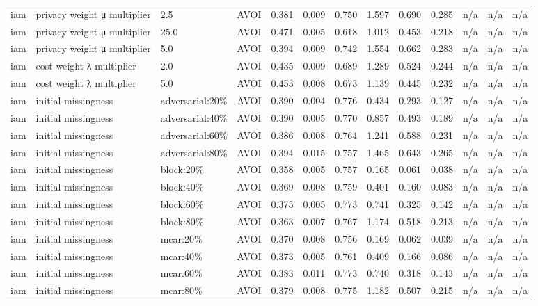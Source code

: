 \begin{table}[!ht]
{\begin{tabular}{lllllllllllll}
iam & privacy weight μ multiplier & 2.5 & AVOI & 0.381 & 0.009 & 0.750 & 1.597 & 0.690 & 0.285 & n/a & n/a & n/a \\
iam & privacy weight μ multiplier & 25.0 & AVOI & 0.471 & 0.005 & 0.618 & 1.012 & 0.453 & 0.218 & n/a & n/a & n/a \\
iam & privacy weight μ multiplier & 5.0 & AVOI & 0.394 & 0.009 & 0.742 & 1.554 & 0.662 & 0.283 & n/a & n/a & n/a \\
iam & cost weight λ multiplier & 2.0 & AVOI & 0.435 & 0.009 & 0.689 & 1.289 & 0.524 & 0.244 & n/a & n/a & n/a \\
iam & cost weight λ multiplier & 5.0 & AVOI & 0.453 & 0.008 & 0.673 & 1.139 & 0.445 & 0.232 & n/a & n/a & n/a \\
iam & initial missingness & adversarial:20\% & AVOI & 0.390 & 0.004 & 0.776 & 0.434 & 0.293 & 0.127 & n/a & n/a & n/a \\
iam & initial missingness & adversarial:40\% & AVOI & 0.390 & 0.005 & 0.770 & 0.857 & 0.493 & 0.189 & n/a & n/a & n/a \\
iam & initial missingness & adversarial:60\% & AVOI & 0.386 & 0.008 & 0.764 & 1.241 & 0.588 & 0.231 & n/a & n/a & n/a \\
iam & initial missingness & adversarial:80\% & AVOI & 0.394 & 0.015 & 0.757 & 1.465 & 0.643 & 0.265 & n/a & n/a & n/a \\
iam & initial missingness & block:20\% & AVOI & 0.358 & 0.005 & 0.757 & 0.165 & 0.061 & 0.038 & n/a & n/a & n/a \\
iam & initial missingness & block:40\% & AVOI & 0.369 & 0.008 & 0.759 & 0.401 & 0.160 & 0.083 & n/a & n/a & n/a \\
iam & initial missingness & block:60\% & AVOI & 0.375 & 0.005 & 0.773 & 0.741 & 0.325 & 0.142 & n/a & n/a & n/a \\
iam & initial missingness & block:80\% & AVOI & 0.363 & 0.007 & 0.767 & 1.174 & 0.518 & 0.213 & n/a & n/a & n/a \\
iam & initial missingness & mcar:20\% & AVOI & 0.370 & 0.008 & 0.756 & 0.169 & 0.062 & 0.039 & n/a & n/a & n/a \\
iam & initial missingness & mcar:40\% & AVOI & 0.373 & 0.005 & 0.761 & 0.409 & 0.166 & 0.086 & n/a & n/a & n/a \\
iam & initial missingness & mcar:60\% & AVOI & 0.383 & 0.011 & 0.773 & 0.740 & 0.318 & 0.143 & n/a & n/a & n/a \\
iam & initial missingness & mcar:80\% & AVOI & 0.379 & 0.008 & 0.775 & 1.182 & 0.507 & 0.215 & n/a & n/a & n/a \\

\end{tabular}}
\end{table}
